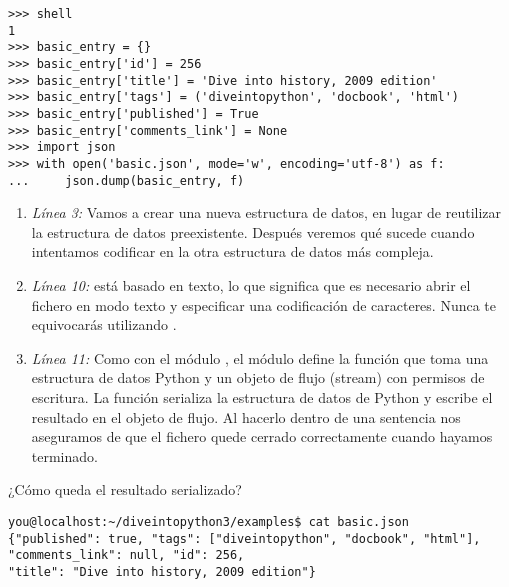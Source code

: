 \noindent\begin{minipage}{\textwidth}
\begin{lstlisting}[mathescape=True]
>>> shell
1
>>> basic_entry = {}
>>> basic_entry['id'] = 256
>>> basic_entry['title'] = 'Dive into history, 2009 edition'
>>> basic_entry['tags'] = ('diveintopython', 'docbook', 'html')
>>> basic_entry['published'] = True
>>> basic_entry['comments_link'] = None
>>> import json
>>> with open('basic.json', mode='w', encoding='utf-8') as f:
...     json.dump(basic_entry, f)
\end{lstlisting}
\end{minipage}

\begin{enumerate}

\item \emph{Línea 3:} Vamos a crear una nueva estructura de datos, en lugar de reutilizar la estructura de datos  preexistente. Después veremos qué sucede cuando intentamos codificar en  la otra estructura de datos más compleja.

\item \emph{Línea 10:}  está basado en texto, lo que significa que es necesario abrir el fichero en modo texto y especificar una codificación de caracteres. Nunca te equivocarás utilizando .

\item \emph{Línea 11:} Como con el módulo , el módulo  define la función  que toma una estructura de datos Python y un objeto de flujo (stream) con permisos de escritura. La función  serializa la estructura de datos de Python y escribe el resultado en el objeto de flujo. Al hacerlo dentro de una sentencia  nos aseguramos de que el fichero quede cerrado correctamente cuando hayamos terminado.

\end{enumerate}

¿Cómo queda el resultado serializado?

\noindent\begin{minipage}{\textwidth}
\begin{lstlisting}[mathescape=False]
you@localhost:~/diveintopython3/examples$ cat basic.json
{"published": true, "tags": ["diveintopython", "docbook", "html"], 
"comments_link": null, "id": 256, 
"title": "Dive into history, 2009 edition"}
\end{lstlisting}
\end{minipage}

